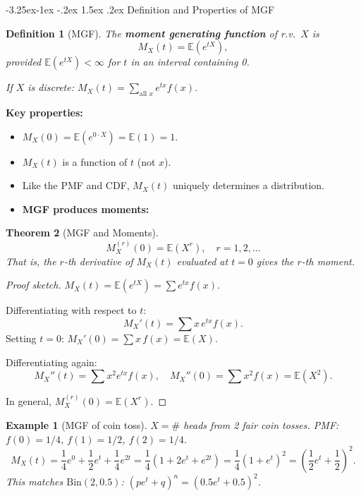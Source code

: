 \documentclass{article}
\makeatletter
\newtheorem{theorem}{Theorem}[section]
\newtheorem{definition}[theorem]{Definition}
\newtheorem{example}{Example}[section]
\theoremstyle{remark}
\newlength{\subsecindent}
\renewcommand\subsection{\@startsection{subsection}{2}{\subsecindent}%
  {-3.25ex\@plus -1ex \@minus -.2ex}%
  {1.5ex \@plus .2ex}%
  {\normalfont\large\bfseries}}
\newenvironment{sub}{%
  \begin{list}{}{%
    \setlength{\leftmargin}{4em}%
    \setlength{\rightmargin}{0pt}%
    \setlength{\topsep}{0pt}%
    \setlength{\partopsep}{0pt}%
    \setlength{\parsep}{\parskip}%
    \setlength{\itemsep}{\parskip}%
  }\item\relax
}{\end{list}}
\newcommand{\E}{\mathbb{E}}
\makeatother
\begin{document}
\subsection{Definition and Properties of MGF}
\begin{sub}

\begin{definition}[MGF]
  The \textbf{moment generating function} of r.v.\ $X$ is
  \begin{equation}
    \boxed{M_X(t) = \E(e^{tX}),}
    \label{eq:mgf-def}
  \end{equation}
  provided $\E(e^{tX}) < \infty$ for $t$ in an interval containing 0.

  If $X$ is discrete: $M_X(t) = \sum_{\text{all } x} e^{tx} f(x)$.
\end{definition}

\textbf{Key properties:}
\begin{itemize}
  \item $M_X(0) = \E(e^{0 \cdot X}) = \E(1) = 1$.
  \item $M_X(t)$ is a function of $t$ (not $x$).
  \item Like the PMF and CDF, $M_X(t)$ uniquely determines a distribution.
  \item \textbf{MGF produces moments:}
\end{itemize}

\begin{theorem}[MGF and Moments]
  \label{thm:mgf-moments}
  \begin{equation}
    \boxed{M_X^{(r)}(0) = \E(X^r), \quad r = 1, 2, \ldots}
    \label{eq:mgf-moments}
  \end{equation}
  That is, the $r$-th derivative of $M_X(t)$ evaluated at $t = 0$ gives
  the $r$-th moment.
\end{theorem}

\begin{proof}[Proof sketch]
  $M_X(t) = \E(e^{tX}) = \sum e^{tx} f(x)$.

  Differentiating with respect to $t$:
  \[
    M_X'(t) = \sum x \, e^{tx} f(x).
  \]
  Setting $t = 0$: $M_X'(0) = \sum x \, f(x) = \E(X)$.

  Differentiating again:
  \[
    M_X''(t) = \sum x^2 e^{tx} f(x), \quad
    M_X''(0) = \sum x^2 f(x) = \E(X^2).
  \]

  In general, $M_X^{(r)}(0) = \E(X^r)$.
\end{proof}

\begin{example}[MGF of coin toss]
  \label{ex:mgf-coin}
  $X = \#$ heads from 2 fair coin tosses. PMF: $f(0) = 1/4$, $f(1) = 1/2$, $f(2) = 1/4$.
  \[
    M_X(t) = \frac{1}{4}e^{0} + \frac{1}{2}e^{t} + \frac{1}{4}e^{2t}
           = \frac{1}{4}(1 + 2e^t + e^{2t})
           = \frac{1}{4}(1 + e^t)^2
           = \left(\frac{1}{2}e^t + \frac{1}{2}\right)^2.
  \]
  This matches $\text{Bin}(2, 0.5)$: $(pe^t + q)^n = (0.5 e^t + 0.5)^2$.
\end{example}


\end{sub}
\end{document}
